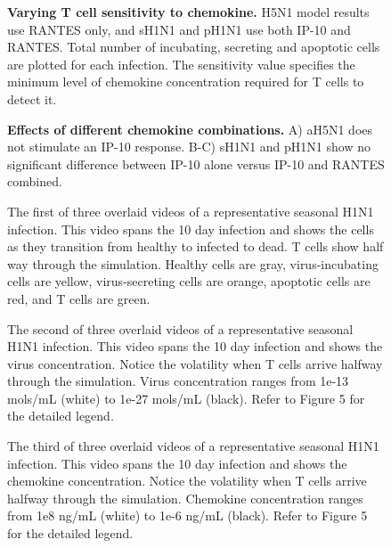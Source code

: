 \documentclass[10pt]{article}
\begin{document}
\setcounter{figure}{0}
\renewcommand{\thefigure}{S\arabic{figure}}

\begin{figure}[ht!]
\begin{center}
 \end{center}
\caption{{\bf Varying T cell sensitivity to chemokine.}  H5N1 model results use RANTES  only, and sH1N1 and pH1N1 use both IP-10 and RANTES. Total number of incubating, secreting and apoptotic cells are plotted for each infection.  The sensitivity value specifies the minimum level of chemokine concentration required for T cells to detect it.} 
\end{figure}


\begin{figure}[!ht]
\begin{center}
 \end{center}
\caption{\textbf{Effects of different chemokine combinations.}  A) aH5N1 does not stimulate an IP-10 response.  B-C) sH1N1 and pH1N1 show no significant difference between IP-10 alone versus IP-10 and RANTES combined.} 
 \label{fig:sensitivity}
\end{figure}

\setcounter{figure}{0}
\renewcommand{\figurename}{Video}

\begin{figure}[ht!]
\caption{The first of three overlaid videos of a representative seasonal H1N1 infection.  This video spans the 10 day infection and shows the cells as they transition from healthy to infected to dead.  T cells show half way through the simulation.  Healthy cells are gray, virus-incubating cells are yellow, virus-secreting cells are orange, apoptotic cells are red, and T cells are green.} 
 \label{video:cell_view}
\end{figure}

\begin{figure}[ht!]
\caption{The second of three overlaid videos of a representative seasonal H1N1 infection.  This video spans the 10 day infection and shows the virus concentration.  Notice the volatility when T cells arrive halfway through the simulation.  Virus concentration ranges from 1e-13 mols/mL (white) to 1e-27 mols/mL (black).  Refer to Figure 5 for the detailed legend. } 
 \label{video:virus_view}
\end{figure}

\begin{figure}[ht!]
\caption{The third of three overlaid videos of a representative seasonal H1N1 infection.  This video spans the 10 day infection and shows the chemokine concentration.  Notice the volatility when T cells arrive halfway through the simulation.  Chemokine concentration ranges from 1e8 ng/mL (white) to 1e-6 ng/mL (black).  Refer to Figure 5 for the detailed legend. } 
 \label{video:chemokine_view}
\end{figure}
\end{document}
